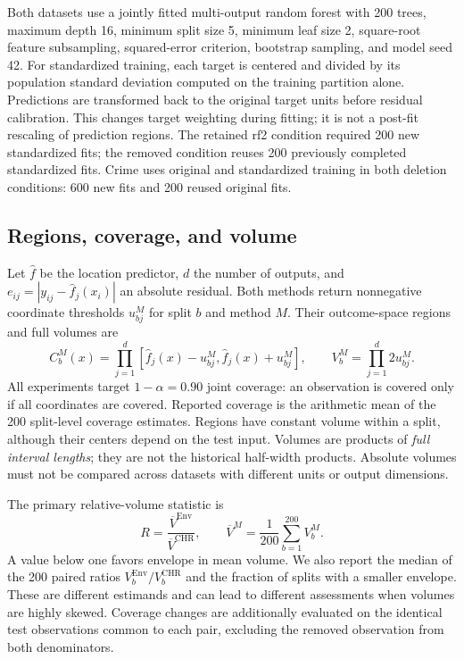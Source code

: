 \documentclass[11pt,letterpaper]{article}
\newcommand{\Env}{\mathrm{Env}}
\newcommand{\CHR}{\mathrm{CHR}}
\begin{document}
Both datasets use a jointly fitted multi-output random forest with 200 trees,
maximum depth 16, minimum split size 5, minimum leaf size 2, square-root feature
subsampling, squared-error criterion, bootstrap sampling, and model seed 42.
For standardized training, each target is centered and divided by its population
standard deviation computed on the training partition alone. Predictions are
transformed back to the original target units before residual calibration.
This changes target weighting during fitting; it is not a post-fit rescaling of
prediction regions. The retained rf2 condition required 200 new standardized
fits; the removed condition reuses 200 previously completed standardized fits.
Crime uses original and standardized training in both deletion conditions:
600 new fits and 200 reused original fits.

\newpage
\subsection{Regions, coverage, and volume}
Let $\widehat f$ be the location predictor, $d$ the number of outputs, and
$e_{ij}=|y_{ij}-\widehat f_j(x_i)|$ an absolute residual. Both methods return
nonnegative coordinate thresholds $u_{bj}^{M}$ for split $b$ and method $M$.
Their outcome-space regions and full volumes are
\begin{equation}
 C_b^M(x)=\prod_{j=1}^{d}
 [\widehat f_j(x)-u_{bj}^M,\widehat f_j(x)+u_{bj}^M],
 \qquad V_b^M=\prod_{j=1}^{d}2u_{bj}^M.
 \label{eq:volume}
\end{equation}
All experiments target $1-\alpha=0.90$ joint coverage: an observation is covered
only if all coordinates are covered. Reported coverage is the arithmetic mean
of the 200 split-level coverage estimates. Regions have constant volume within
a split, although their centers depend on the test input. Volumes are products
of \emph{full interval lengths}; they are not the historical half-width products.
Absolute volumes must not be compared across datasets with different units or
output dimensions.

The primary relative-volume statistic is
\begin{equation}
 R=\frac{\overline V^{\Env}}{\overline V^{\CHR}},
 \qquad \overline V^M=\frac{1}{200}\sum_{b=1}^{200}V_b^M.
 \label{eq:ratio}
\end{equation}
A value below one favors envelope in mean volume. We also report the median
of the 200 paired ratios $V_b^{\Env}/V_b^{\CHR}$ and the fraction of splits
with a smaller envelope. These are different estimands and can lead to
different assessments when volumes are highly skewed. Coverage changes are
additionally evaluated on the identical test observations common to each pair,
excluding the removed observation from both denominators.
\end{document}
